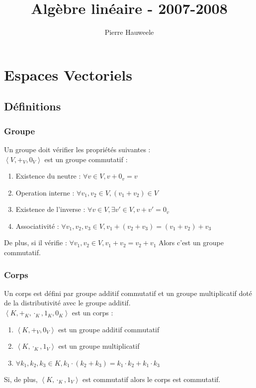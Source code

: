\documentclass[a4paper,10pt]{article}
\author{Pierre Hauweele}
\title{Algèbre linéaire - 2007-2008}
\date{}
\newcommand{\grp}[1]{\left\langle #1 \right\rangle} %
\begin{document}
 \maketitle %
 \tableofcontents
 \newpage

 \section{Espaces Vectoriels}
  \subsection{Définitions}
  \subsubsection{Groupe}
   Un groupe doit vérifier les propriétés suivantes :\\
   $\grp{V, +_V, 0_V}$ est un groupe commutatif :
   \begin{enumerate}
    \item Existence du neutre : $\forall v \in V, v + 0_v = v$
    \item Operation interne : $\forall v_1, v_2\in V, (v_1 + v_2) \in V$
    \item Existence de l'inverse : $\forall v \in V, \exists v' \in V, v+v' = 0_v$
    \item Associativité : $\forall v_1, v_2, v_3 \in V, v_1 + (v_2 + v_3) = (v_1 + v_2) + v_3$
   \end{enumerate}
   De plus, si il vérifie :
    $\forall v_1, v_2 \in V, v_1 + v_2 = v_2 + v_1$
   Alors c'est un groupe commutatif.

  \subsubsection{Corps}
   Un corps est défini par groupe additif commutatif et un groupe multiplicatif doté de la distributivité avec le groupe additif.\\
   $\grp{K, +_K, \cdot_K, 1_K, 0_K}$ est un corps :
   \begin{enumerate}
    \item $\grp{K, +_V, 0_V}$ est un groupe additif commutatif
    \item $\grp{K, \cdot_K, 1_V}$ est un groupe multiplicatif
    \item $\forall k_1, k_2, k_3 \in K, k_1 \cdot (k_2 + k_3) = k_1 \cdot k_2 + k_1 \cdot k_3$
   \end{enumerate}
   Si, de plus, $\grp{K, \cdot_K, 1_V}$ est commutatif alors le corps est commutatif.
\end{document}
